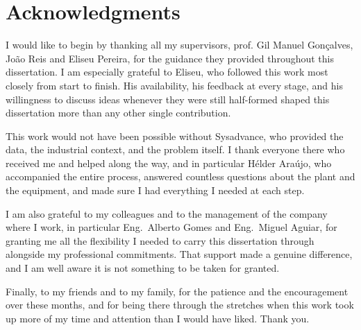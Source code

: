 \chapter*{Acknowledgments}

I would like to begin by thanking all my supervisors, prof. Gil Manuel Gonçalves, João Reis and Eliseu Pereira, for the
guidance they provided throughout this dissertation. I am especially grateful to Eliseu, who
followed this work most closely from start to finish. His availability, his feedback at every stage, and
his willingness to discuss ideas whenever they were still half-formed shaped this dissertation more than
any other single contribution.

This work would not have been possible without Sysadvance, who provided the data, the industrial context,
and the problem itself. I thank everyone there who received me and helped along the way, and in particular
Hélder Araújo, who accompanied the entire process, answered countless questions about the plant and the
equipment, and made sure I had everything I needed at each step.

I am also grateful to my colleagues and to the management of the company where I work, in particular
Eng.\ Alberto Gomes and Eng.\ Miguel Aguiar, for granting me all the flexibility I needed to carry this
dissertation through alongside my professional commitments. That support made a genuine difference, and I
am well aware it is not something to be taken for granted.

Finally, to my friends and to my family, for the patience and the encouragement over these months, and for
being there through the stretches when this work took up more of my time and attention than I would have
liked. Thank you.

\vspace{10mm}
